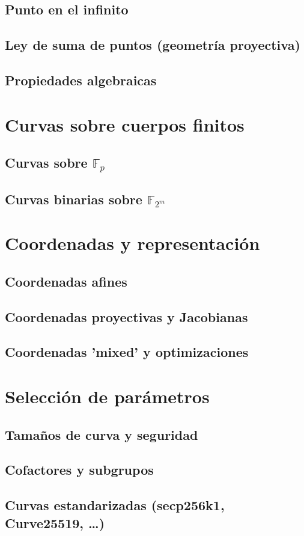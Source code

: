 \subsection{Punto en el infinito}
\subsection{Ley de suma de puntos (geometría proyectiva)}
\subsection{Propiedades algebraicas}

\section{Curvas sobre cuerpos finitos}
\subsection{Curvas sobre \texorpdfstring{$\mathbb{F}_p$}{Fp}}
\subsection{Curvas binarias sobre \texorpdfstring{$\mathbb{F}_{2^m}$}{F2m}}

\section{Coordenadas y representación}
\subsection{Coordenadas afines}
\subsection{Coordenadas proyectivas y Jacobianas}
\subsection{Coordenadas 'mixed' y optimizaciones}

\section{Selección de parámetros}
\subsection{Tamaños de curva y seguridad}
\subsection{Cofactores y subgrupos}
\subsection{Curvas estandarizadas (secp256k1, Curve25519, …)}